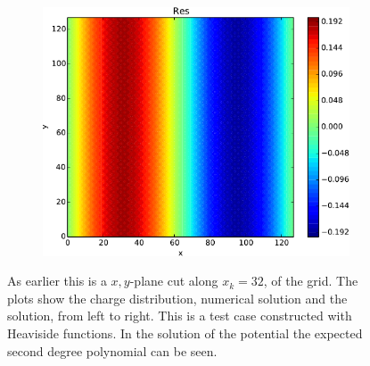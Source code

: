 \begin{figure}
\begin{subfigure}[b]{0.32\textwidth}
					\includegraphics[width = \textwidth]{figures/verification/heaviside/residual.pdf}
				\end{subfigure}
			\caption{As earlier this is a \(x,y\)-plane cut along \(x_k=32\), of the grid. The plots show the charge distribution,
			numerical solution and the solution, from left to right. This is a test case constructed
			with Heaviside functions. In the solution of the potential the expected second degree polynomial can be seen.
			}
			\label{fig:heaviside}
		\end{figure}

